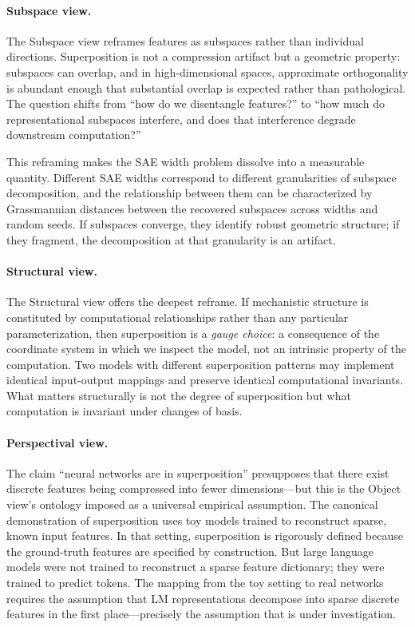 \documentclass{article}
\begin{document}
\paragraph{Subspace view.}
The Subspace view reframes features as subspaces rather than individual directions. Superposition is not a compression artifact but a geometric property: subspaces can overlap, and in high-dimensional spaces, approximate orthogonality is abundant enough that substantial overlap is expected rather than pathological. The question shifts from ``how do we disentangle features?'' to ``how much do representational subspaces interfere, and does that interference degrade downstream computation?''

This reframing makes the SAE width problem dissolve into a measurable quantity. Different SAE widths correspond to different granularities of subspace decomposition, and the relationship between them can be characterized by Grassmannian distances between the recovered subspaces across widths and random seeds. If subspaces converge, they identify robust geometric structure; if they fragment, the decomposition at that granularity is an artifact.

\paragraph{Structural view.}
The Structural view offers the deepest reframe. If mechanistic structure is constituted by computational relationships rather than any particular parameterization, then superposition is a \emph{gauge choice}: a consequence of the coordinate system in which we inspect the model, not an intrinsic property of the computation. Two models with different superposition patterns may implement identical input-output mappings and preserve identical computational invariants. What matters structurally is not the degree of superposition but what computation is invariant under changes of basis.

\paragraph{Perspectival view.}
The claim ``neural networks are in superposition'' presupposes that there exist discrete features being compressed into fewer dimensions---but this is the Object view's ontology imposed as a universal empirical assumption. The canonical demonstration of superposition \citep{elhage2022superposition} uses toy models trained to reconstruct sparse, known input features. In that setting, superposition is rigorously defined because the ground-truth features are specified by construction. But large language models were not trained to reconstruct a sparse feature dictionary; they were trained to predict tokens. The mapping from the toy setting to real networks requires the assumption that LM representations decompose into sparse discrete features in the first place---precisely the assumption that is under investigation.
\end{document}
